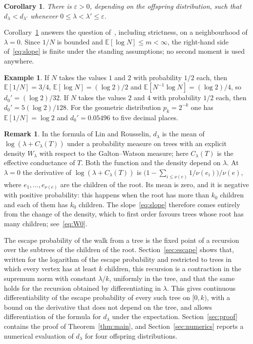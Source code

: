 \documentclass[11pt]{amsart}
\newtheorem{corollary}[theorem]{Corollary}
\theoremstyle{definition}
\newtheorem{example}[theorem]{Example}
\newtheorem{remark}[theorem]{Remark}
\newcommand{\E}{\mathbb{E}}
\newcommand{\eps}{\varepsilon}
\begin{document}
\begin{corollary}\label{cor:mono}
There is $\eps>0$, depending on the offspring distribution, such that $d_\lambda<d_{\lambda'}$ whenever
$0\le\lambda<\lambda'\le\eps$.
\end{corollary}

Corollary~\ref{cor:mono} answers the question of~\cite{LPP97}, including strictness, on a neighbourhood of
$\lambda=0$. Since $1/N$ is bounded and $\E[\log N]\le m<\infty$, the right-hand side of~\eqref{eq:slope} is
finite under the standing assumptions; no second moment is used anywhere.

\begin{example}
If $N$ takes the values $1$ and $2$ with probability $1/2$ each, then $\E[1/N]=3/4$, $\E[\log N]=(\log 2)/2$ and
$\E[N^{-1}\log N]=(\log2)/4$, so $d_0'=(\log 2)/32$. If $N$ takes the values $2$ and $4$ with probability $1/2$
each, then $d_0'=5(\log2)/128$. For the geometric distribution $p_k=2^{-k}$ one has $\E[1/N]=\log 2$ and
$d_0'=0.05496$ to five decimal places.
\end{example}

\begin{remark}\label{rem:tilt}
In the formula of Lin and Rousselin, $d_\lambda$ is the mean of $\log(\lambda+C_\lambda(T))$ under a probability
measure on trees with an explicit density $W_\lambda$ with respect to the Galton--Watson measure; here
$C_\lambda(T)$ is the effective conductance of $T$. Both the function and the density depend on $\lambda$. At
$\lambda=0$ the derivative of $\log(\lambda+C_\lambda(T))$ is
$\bigl(1-\sum_{i\le\nu(e)}1/\nu(e_i)\bigr)/\nu(e)$, where $e_1,\dots,e_{\nu(e)}$ are the children of the root.
Its mean is zero, and it is negative with positive probability: this happens when the root has more than
$k_0$ children and each of them has $k_0$ children. The slope~\eqref{eq:slope} therefore comes entirely from the
change of the density, which to first order favours trees whose root has many children; see~\eqref{eq:W0}.
\end{remark}

The escape probability of the walk from a tree is the fixed point of a recursion over the subtrees of the
children of the root. Section~\ref{sec:escape} shows that, written for the logarithm of the escape probability
and restricted to trees in which every vertex has at least $k$ children, this recursion is a contraction in the
supremum norm with constant $\lambda/k$, uniformly in the tree, and that the same holds for the recursion
obtained by differentiating in $\lambda$. This gives continuous differentiability of the escape probability of
every such tree on $[0,k)$, with a bound on the derivative that does not depend on the tree, and allows
differentiation of the formula for $d_\lambda$ under the expectation. Section~\ref{sec:proof} contains the proof
of Theorem~\ref{thm:main}, and Section~\ref{sec:numerics} reports a numerical evaluation of $d_\lambda$ for four
offspring distributions.
\end{document}

